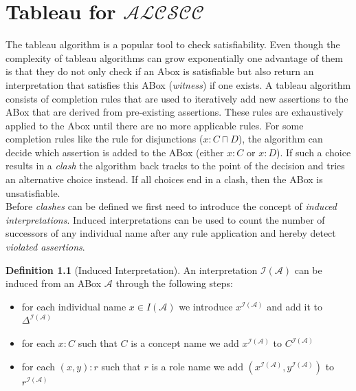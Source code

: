 \documentclass{book}
\theoremstyle{break}
\theoremstyle{definition}
\newtheorem{mydef}{Definition}
\begin{document}
\chapter{Tableau for $\mathcal{ALCSCC}$}
The tableau algorithm is a popular tool to check satisfiability. Even though the complexity of tableau algorithms can grow exponentially one advantage of them is that they do not only check if an Abox is satisfiable but also return an interpretation that satisfies this ABox (\textit{witness}) if one exists. A tableau algorithm consists of completion rules that are used to iteratively add new assertions to the ABox that are derived from pre-existing assertions. These rules are exhaustively applied to the Abox until there are no more applicable rules. For some completion rules like the rule for disjunctions ($x:C\sqcap D$), the algorithm can decide which assertion is added to the ABox (either $x:C$ or $x:D$). If such a choice results in a \textit{clash} the algorithm back tracks to the point of the decision and tries an alternative choice instead. If all choices end in a clash, then the ABox is unsatisfiable.\\
Before \textit{clashes} can be defined we first need to introduce the concept of \textit{induced interpretations}. Induced interpretations can be used to count the number of successors of any individual name after any rule application and hereby detect \textit{violated assertions}.
\begin{mydef}[Induced Interpretation]
An interpretation $\mathcal{I}(\mathcal{A})$ can be induced from an ABox $\mathcal{A}$ through the following steps:
\begin{itemize}
\item for each individual name $x\in I(\mathcal{A})$ we introduce $x^{\mathcal{I}(\mathcal{A})}$ and add it to $\Delta^{\mathcal{I}(\mathcal{A})}$
\item for each $x:C$ such that $C$ is a concept name we add $x^{\mathcal{I}(\mathcal{A})}$ to $C^{\mathcal{I}(\mathcal{A})}$
\item for each $(x,y):r$ such that $r$ is a role name we add $(x^{\mathcal{I}(\mathcal{A})},y^{\mathcal{I}(\mathcal{A})})$ to $r^{\mathcal{I}(\mathcal{A})}$
\end{itemize}
\end{mydef}
\end{document}
